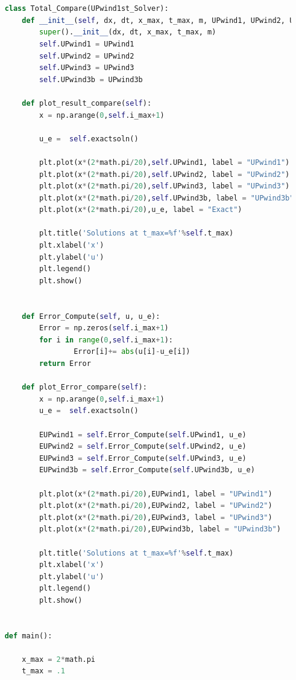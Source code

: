 \documentclass[12pt]{article}
\begin{document}
\begin{scriptsize}
\begin{lstlisting}[language=python,caption={Problem1, Py code for Solvers}]
    
    
    class Total_Compare(UPwind1st_Solver):
        def __init__(self, dx, dt, x_max, t_max, m, UPwind1, UPwind2, UPwind3, UPwind3b):
            super().__init__(dx, dt, x_max, t_max, m)
            self.UPwind1 = UPwind1
            self.UPwind2 = UPwind2
            self.UPwind3 = UPwind3
            self.UPwind3b = UPwind3b
    
        def plot_result_compare(self):
            x = np.arange(0,self.i_max+1)
    
            u_e =  self.exactsoln()
    
            plt.plot(x*(2*math.pi/20),self.UPwind1, label = "UPwind1")
            plt.plot(x*(2*math.pi/20),self.UPwind2, label = "UPwind2")
            plt.plot(x*(2*math.pi/20),self.UPwind3, label = "UPwind3")
            plt.plot(x*(2*math.pi/20),self.UPwind3b, label = "UPwind3b")
            plt.plot(x*(2*math.pi/20),u_e, label = "Exact")
    
            plt.title('Solutions at t_max=%f'%self.t_max)
            plt.xlabel('x')
            plt.ylabel('u')
            plt.legend()
            plt.show()
    

        def Error_Compute(self, u, u_e):
            Error = np.zeros(self.i_max+1)
            for i in range(0,self.i_max+1):
                    Error[i]+= abs(u[i]-u_e[i])
            return Error
    
        def plot_Error_compare(self):
            x = np.arange(0,self.i_max+1)
            u_e =  self.exactsoln()
    
            EUPwind1 = self.Error_Compute(self.UPwind1, u_e)
            EUPwind2 = self.Error_Compute(self.UPwind2, u_e)
            EUPwind3 = self.Error_Compute(self.UPwind3, u_e)
            EUPwind3b = self.Error_Compute(self.UPwind3b, u_e)
    
            plt.plot(x*(2*math.pi/20),EUPwind1, label = "UPwind1")
            plt.plot(x*(2*math.pi/20),EUPwind2, label = "UPwind2")
            plt.plot(x*(2*math.pi/20),EUPwind3, label = "UPwind3")
            plt.plot(x*(2*math.pi/20),EUPwind3b, label = "UPwind3b")
    
            plt.title('Solutions at t_max=%f'%self.t_max)
            plt.xlabel('x')
            plt.ylabel('u')
            plt.legend()
            plt.show()
    
    
    def main():
    
        x_max = 2*math.pi
        t_max = .1
    

\end{lstlisting}
\end{scriptsize}
\end{document}
